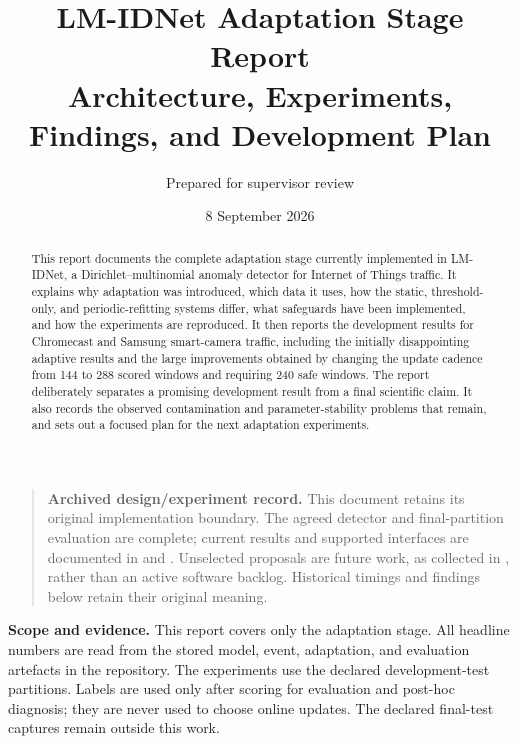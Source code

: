\documentclass[11pt,a4paper]{article}
\title{\textbf{LM-IDNet Adaptation Stage Report}\\
\large Architecture, Experiments, Findings, and Development Plan}
\author{Prepared for supervisor review}
\date{8 September 2026}
\newcommand{\projectname}{LM-IDNet}
\begin{document}
\maketitle

\begin{quote}
\textbf{Archived design/experiment record.} This document retains its original
implementation boundary. The agreed detector and final-partition evaluation
are complete; current results and supported interfaces are documented in
 and
. Unselected proposals are future
work, as collected in , rather than an active software
backlog. Historical timings and findings below retain their original meaning.
\end{quote}

\thispagestyle{empty}

\begin{abstract}
This report documents the complete adaptation stage currently implemented in
\projectname{}, a Dirichlet--multinomial anomaly detector for Internet of
Things traffic. It explains why adaptation was introduced, which data it uses,
how the static, threshold-only, and periodic-refitting systems differ, what
safeguards have been implemented, and how the experiments are reproduced. It
then reports the development results for Chromecast and Samsung smart-camera
traffic, including the initially disappointing adaptive results and the large
improvements obtained by changing the update cadence from 144 to 288 scored
windows and requiring 240 safe windows. The report deliberately separates a
promising development result from a final scientific claim. It also records
the observed contamination and parameter-stability problems that remain, and
sets out a focused plan for the next adaptation experiments.
\end{abstract}

\vfill
\begin{center}
\begin{minipage}{0.88\textwidth}
\small
\textbf{Scope and evidence.} This report covers only the adaptation stage. All
headline numbers are read from the stored model, event, adaptation, and
evaluation artefacts in the repository. The experiments use the declared
development-test partitions. Labels are used only after scoring for evaluation
and post-hoc diagnosis; they are never used to choose online updates. The
declared final-test captures remain outside this work.
\end{minipage}
\end{center}
\end{document}
